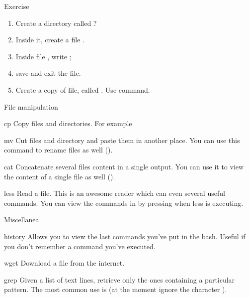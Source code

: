 \begin{frame}{Exercise}

	\begin{enumerate}
		\item<1-> Create a directory called ?
		\item<2-> Inside it, create a file .
		\item<3-> Inside file , write ;
		\item<4-> save and exit the file.
		\item<3-> Create a copy of  file, called . Use  command.
	\end{enumerate}
	
\end{frame}

\begin{frame}{File manipulation}
	\begin{block}{cp}
		Copy files and directories. For example 
	\end{block}
	
	\begin{block}{mv}
		Cut files and directory and paste them in another place. You can use this command to rename files as well (\eg {}).
	\end{block}
	
	\begin{block}{cat}
		Concatenate several files content in a single output. You can use it to view the content of a single file as well (\eg {}).
	\end{block}
	
	\begin{block}{less}
		Read a file. This is an awesome reader which can even several useful commands. You can view the commands in  by pressing  when less is executing.
	\end{block}
\end{frame}

\begin{frame}{Miscellanea}
	\begin{block}{history}
		Allows you to view the last commands you've put in the bash. Useful if you don't remember a command you've executed.
	\end{block}
	
	\begin{block}{wget}
		Download a file from the internet.
	\end{block}
	
	\begin{block}{grep}
		Given a list of text lines, retrieve only the ones containing a particular pattern. The most common use is  (at the moment ignore the character \code{|}).
	\end{block}
\end{frame}

